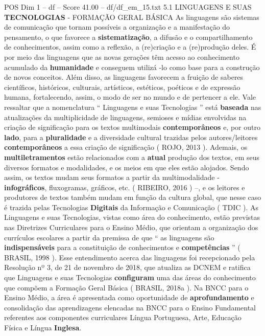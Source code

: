 \begin{textsample}{POS Dim 1 – df – Score 41.00 – df/df\_em\_15.txt}  \label{ex:f1_pos_129}
5.1 LINGUAGENS E SUAS \textbf{TECNOLOGIAS} - FORMAÇÃO GERAL BÁSICA As linguagens são sistemas de comunicação que tornam possíveis a organização e a manifestação do pensamento, o que favorece a \textbf{sistematização}, a difusão e o compartilhamento de conhecimentos, assim como a reflexão, a (re)criação e a (re)produção deles.
É por meio das linguagens que as novas gerações têm acesso ao conhecimento acumulado da \textbf{humanidade} e conseguem utilizá -lo como base para a construção de novos conceitos.
Além disso, as linguagens favorecem a fruição de saberes científicos, históricos, culturais, artísticos, estéticos, poéticos e de expressão humana, fortalecendo, assim, o modo de ser no mundo e de pertencer a ele.
Vale ressaltar que a nomenclatura “ Linguagens e suas Tecnologias ” está \textbf{baseada} nas atualizações da multiplicidade de linguagens, semioses e mídias envolvidas na criação de significação para os textos multimodais \textbf{contemporâneos} e, por outro \textbf{lado}, para a \textbf{pluralidade} e a diversidade cultural trazidas pelos autores/leitores \textbf{contemporâneos} a essa criação de significação ( ROJO, 2013 ).
Ademais, os \textbf{multiletramentos} estão relacionados com a \textbf{atual} produção dos textos, em seus diversos formatos e modalidades, e os meios em que eles estão alojados.
Sendo assim, os textos mudam seus formatos a partir da multimodalidade - \textbf{infográficos}, fluxogramas, gráficos, etc. ( RIBEIRO, 2016 ) –, e os leitores e produtores de textos também mudam em função da cultura global, que nesse caso é trazida pelas Tecnologias \textbf{Digitais} da Informação e Comunicação ( TDIC ).
As Linguagens e suas Tecnologias, vistas como área do conhecimento, estão previstas nas Diretrizes Curriculares para o Ensino Médio, que orientam a organização dos currículos escolares a partir da premissa de que “ as linguagens são \textbf{indispensáveis} para a constituição de conhecimentos e \textbf{competências} ” ( BRASIL, 1998 ).
Esse entendimento acerca das linguagens foi recepcionado pela Resolução nº 3, de 21 de novembro de 2018, que atualiza as DCNEM e ratifica que Linguagens e suas Tecnologias \textbf{configuram} uma das áreas do conhecimento que compõem a Formação Geral Básica ( BRASIL, 2018a ).
Na BNCC para o Ensino Médio, a área é apresentada como oportunidade de \textbf{aprofundamento} e consolidação das aprendizagens elencadas na BNCC para o Ensino Fundamental referentes aos componentes curriculares Língua Portuguesa, Arte, Educação Física e Língua \textbf{Inglesa}.

\end{textsample}
